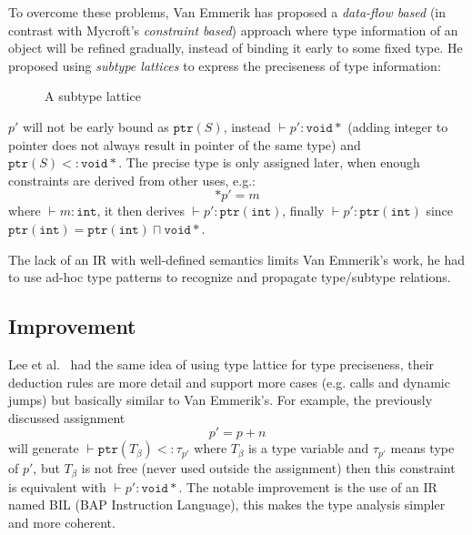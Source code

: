\documentclass[compsoc,conference,a4paper,10pt,times]{IEEEtran}
\begin{document}
To overcome these problems, Van Emmerik has proposed a \emph{data-flow based}
(in contrast with Mycroft's \emph{constraint based}) approach where type information of an object will be refined gradually,
instead of binding it early to some fixed type. He proposed using \emph{subtype lattices} to express the
preciseness of type information:
\begin{figure}[h]
  \centering
  \caption{A subtype lattice}
\end{figure}
$p'$ will not be early bound as $\mathtt{ptr}(S)$, instead $\vdash p' \colon \mathtt{void*}$
(adding integer to pointer does not always result in pointer of the same type) and
$\mathtt{ptr}(S) <\colon \mathtt{void*}$. The precise type
is only assigned later, when enough constraints are derived from other uses, e.g.:
\begin{equation*}
  *{p'} = m
\end{equation*}
where $\vdash m \colon \mathtt{int}$, it then derives $\vdash p' \colon \mathtt{ptr}(\mathtt{int})$,
finally $\vdash p' \colon \mathtt{ptr}(\mathtt{int})$ since
$\mathtt{ptr}(\mathtt{int}) = \mathtt{ptr}(\mathtt{int}) \sqcap \mathtt{void*}$.

The lack of an IR with well-defined semantics limits Van Emmerik's work, he had to use ad-hoc
type patterns to recognize and propagate type/subtype relations.

\subsection{Improvement}
\noindent
Lee et al.~\cite{lee_tie_2011} had the same idea of using type lattice for type preciseness,
their deduction rules are more detail and support more cases
(e.g. calls and dynamic jumps) but basically similar to Van Emmerik's. For example,
the previously discussed assignment
\begin{equation*}
  p' = p + n
\end{equation*}
will generate $\vdash \mathtt{ptr}(T_{\beta}) <\colon \tau_{p'}$ where $T_{\beta}$ is
a type variable and $\tau_{p'}$ means type of $p'$, but $T_{\beta}$ is not free (never used outside
the assignment) then this constraint is equivalent with $\vdash p' \colon \mathtt{void*}$. The notable
improvement is the use of an IR named BIL (BAP Instruction Language), this makes the type analysis
simpler and more coherent.
\end{document}
